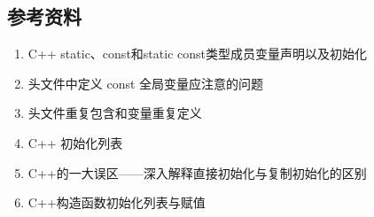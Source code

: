 \documentclass[letterpaper,10pt,english]{sphinxmanual}
\begin{document}
\subsection{参考资料}
\label{\detokenize{cpp/16_staticconst:id2}}\begin{enumerate}
\item {} 
C++ static、const和static const类型成员变量声明以及初始化

\end{enumerate}
\begin{quote}

\end{quote}
\begin{enumerate}
\setcounter{enumi}{1}
\item {} 
头文件中定义 const 全局变量应注意的问题

\end{enumerate}
\begin{quote}

\end{quote}
\begin{enumerate}
\setcounter{enumi}{2}
\item {} 
头文件重复包含和变量重复定义

\end{enumerate}
\begin{quote}

\end{quote}
\begin{enumerate}
\setcounter{enumi}{3}
\item {} 
C++ 初始化列表

\end{enumerate}
\begin{quote}

\end{quote}
\begin{enumerate}
\setcounter{enumi}{4}
\item {} 
C++的一大误区——深入解释直接初始化与复制初始化的区别

\end{enumerate}
\begin{quote}

\end{quote}
\begin{enumerate}
\setcounter{enumi}{5}
\item {} 
C++构造函数初始化列表与赋值

\end{enumerate}
\begin{quote}


\end{quote}
\end{document}
